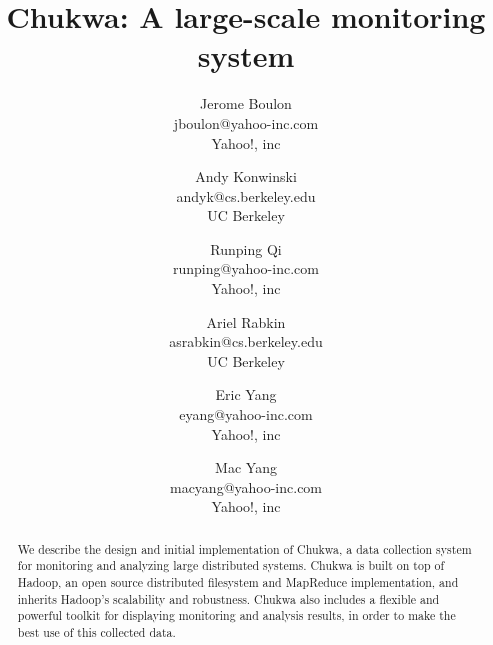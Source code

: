 \documentclass[letterpaper,twocolumn,10pt]{article}
\begin{document}
\date{}

\title{  Chukwa: A large-scale monitoring system}

\author{
{\rm Jerome Boulon}\\
{\rm jboulon@yahoo-inc.com}\\
Yahoo!, inc
\and
{\rm Andy Konwinski}\\
{\rm andyk@cs.berkeley.edu}\\
UC Berkeley
\and
{\rm Runping Qi}\\
{\rm runping@yahoo-inc.com}\\
Yahoo!, inc
\and
{\rm Ariel Rabkin}\\
{\rm asrabkin@cs.berkeley.edu}\\
UC Berkeley
\and
{\rm Eric Yang}\\
{\rm eyang@yahoo-inc.com}\\
Yahoo!, inc
\and
{\rm Mac Yang}\\
{\rm macyang@yahoo-inc.com}\\
Yahoo!, inc
} %

\maketitle


\begin{abstract}

We describe the design and initial implementation of Chukwa, a data collection system for monitoring and analyzing large distributed systems. Chukwa is built on top of Hadoop, an open source distributed filesystem and MapReduce implementation, and inherits Hadoop's scalability and robustness. 
Chukwa also includes a flexible and powerful toolkit for displaying monitoring and analysis results, in order to make the best use of this collected data. 

\end{abstract}
\end{document}
